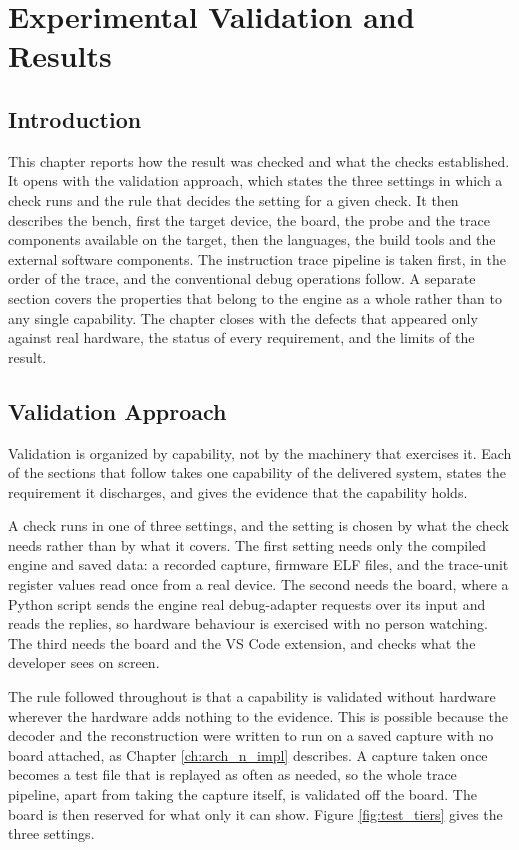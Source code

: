 \chapter{Experimental Validation and Results}
\label{sec:testing}

\section*{Introduction}
This chapter reports how the result was checked and what the checks established. It opens with the validation approach, which states the three settings in which a check runs and the rule that decides the setting for a given check. It then describes the bench, first the target device, the board, the probe and the trace components available on the target, then the languages, the build tools and the external software components. The instruction trace pipeline is taken first, in the order of the trace, and the conventional debug operations follow. A separate section covers the properties that belong to the engine as a whole rather than to any single capability. The chapter closes with the defects that appeared only against real hardware, the status of every requirement, and the limits of the result.

\section{Validation Approach}
\label{sec:test_strategy}
\label{sec:offline_tier}
\label{sec:ontarget_tier}
\label{sec:frontend_tier}
Validation is organized by capability, not by the machinery that exercises it. Each of the sections that follow takes one capability of the delivered system, states the requirement it discharges, and gives the evidence that the capability holds.

A check runs in one of three settings, and the setting is chosen by what the check needs rather than by what it covers. The first setting needs only the compiled engine and saved data: a recorded capture, firmware ELF files, and the trace-unit register values read once from a real device. The second needs the board, where a Python script sends the engine real debug-adapter requests over its input and reads the replies, so hardware behaviour is exercised with no person watching. The third needs the board and the VS Code extension, and checks what the developer sees on screen.

The rule followed throughout is that a capability is validated without hardware wherever the hardware adds nothing to the evidence. This is possible because the decoder and the reconstruction were written to run on a saved capture with no board attached, as Chapter \ref{ch:arch_n_impl} describes. A capture taken once becomes a test file that is replayed as often as needed, so the whole trace pipeline, apart from taking the capture itself, is validated off the board. The board is then reserved for what only it can show. Figure \ref{fig:test_tiers} gives the three settings.

